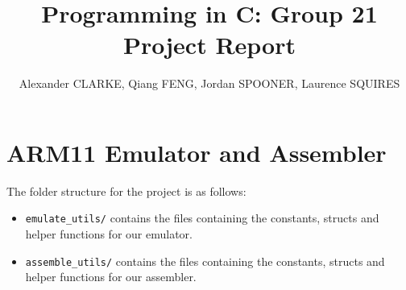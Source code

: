 \documentclass[10pt]{article}
\begin{document}
\title{\vspace{-2cm}Programming in C: Group 21 Project Report}
\author{\small Alexander CLARKE, Qiang FENG, Jordan SPOONER, Laurence SQUIRES}

\maketitle

\section{ARM11 Emulator and Assembler}

The folder structure for the project is as follows:

\begin{itemize}
\item \texttt{emulate\_utils/} contains the files containing the constants, structs and helper functions for our emulator.
\item \texttt{assemble\_utils/} contains the files containing the constants, structs and helper functions for our assembler.
\end{itemize}
\end{document}
